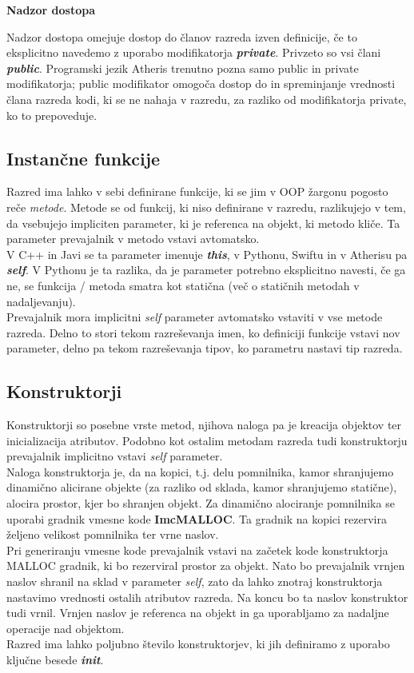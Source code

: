 \documentclass[a4paper, 12p]{book}
\begin{document}
\textbf{Nadzor dostopa}

Nadzor dostopa omejuje dostop do članov razreda izven definicije, če to eksplicitno navedemo z uporabo modifikatorja \textit{\textbf{private}}. Privzeto so vsi člani \textit{\textbf{public}}. Programski jezik Atheris trenutno pozna samo public in private modifikatorja; public modifikator omogoča dostop do in spreminjanje vrednosti člana razreda kodi, ki se ne nahaja v razredu, za razliko od modifikatorja private, ko to prepoveduje. 

\subsection{Instančne funkcije}

Razred ima lahko v sebi definirane funkcije, ki se jim v OOP žargonu pogosto reče \textit{metode}. Metode se od funkcij, ki niso definirane v razredu, razlikujejo v tem, da vsebujejo impliciten parameter, ki je referenca na objekt, ki metodo kliče. Ta parameter prevajalnik v metodo vstavi avtomatsko. \\
\indent V C++ in Javi se ta parameter imenuje \textbf{\textit{this}}, v Pythonu, Swiftu in v Atherisu pa \textbf{\textit{self}}. V Pythonu je ta razlika, da je parameter potrebno eksplicitno navesti, če ga ne, se funkcija / metoda smatra kot statična (več o statičnih metodah v nadaljevanju). \\
\indent Prevajalnik mora implicitni \textit{self} parameter avtomatsko vstaviti v vse metode razreda. Delno to stori tekom razreševanja imen, ko definiciji funkcije vstavi nov parameter, delno pa tekom razreševanja tipov, ko parametru nastavi tip razreda. \\

\subsection{Konstruktorji}

Konstruktorji so posebne vrste metod, njihova naloga pa je kreacija objektov ter inicializacija atributov. Podobno kot ostalim metodam razreda tudi konstruktorju prevajalnik implicitno vstavi \textit{self} parameter. \\
\indent Naloga konstruktorja je, da na kopici, t.j. delu pomnilnika, kamor shranjujemo dinamično alicirane objekte (za razliko od sklada, kamor shranjujemo statične), alocira prostor, kjer bo shranjen objekt. Za dinamično alociranje pomnilnika se uporabi gradnik vmesne kode \textbf{ImcMALLOC}. Ta gradnik na kopici rezervira željeno velikost pomnilnika ter vrne naslov. \\
\indent Pri generiranju vmesne kode prevajalnik vstavi na začetek kode konstruktorja MALLOC gradnik, ki bo rezerviral prostor za objekt. Nato bo prevajalnik vrnjen naslov shranil na sklad v parameter \textit{self}, zato da lahko znotraj konstruktorja nastavimo vrednosti ostalih atributov razreda. Na koncu bo ta naslov konstruktor tudi vrnil. Vrnjen naslov je referenca na objekt in ga uporabljamo za nadaljne operacije nad objektom. \\
\indent Razred ima lahko poljubno število konstruktorjev, ki jih definiramo z uporabo ključne besede \textit{\textbf{init}}. 
\end{document}

